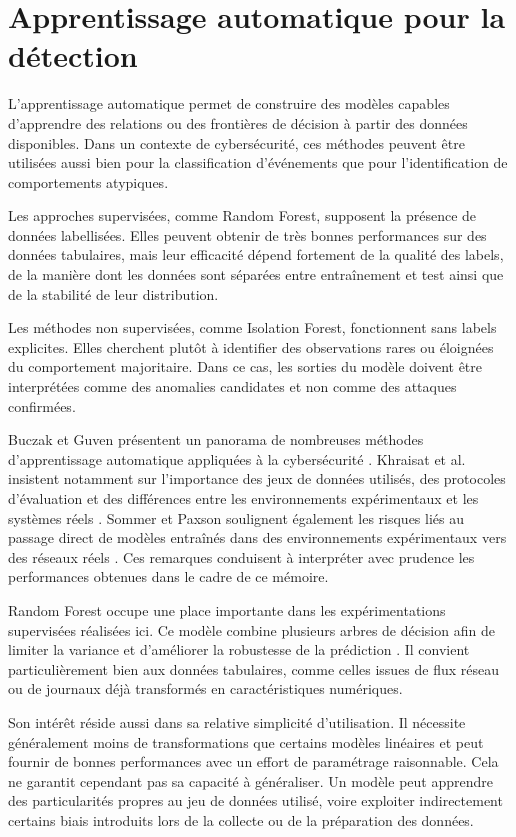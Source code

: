 \section{Apprentissage automatique pour la détection}

L'apprentissage automatique permet de construire des modèles capables d'apprendre des relations ou des frontières de décision à partir des données disponibles. Dans un contexte de cybersécurité, ces méthodes peuvent être utilisées aussi bien pour la classification d'événements que pour l'identification de comportements atypiques.

Les approches supervisées, comme Random Forest, supposent la présence de données labellisées. Elles peuvent obtenir de très bonnes performances sur des données tabulaires, mais leur efficacité dépend fortement de la qualité des labels, de la manière dont les données sont séparées entre entraînement et test ainsi que de la stabilité de leur distribution.

Les méthodes non supervisées, comme Isolation Forest, fonctionnent sans labels explicites. Elles cherchent plutôt à identifier des observations rares ou éloignées du comportement majoritaire. Dans ce cas, les sorties du modèle doivent être interprétées comme des anomalies candidates et non comme des attaques confirmées.

Buczak et Guven présentent un panorama de nombreuses méthodes d'apprentissage automatique appliquées à la cybersécurité \cite{buczak2016survey}. Khraisat et al. insistent notamment sur l'importance des jeux de données utilisés, des protocoles d'évaluation et des différences entre les environnements expérimentaux et les systèmes réels \cite{khraisat2019survey}. Sommer et Paxson soulignent également les risques liés au passage direct de modèles entraînés dans des environnements expérimentaux vers des réseaux réels \cite{sommer2010outside}. Ces remarques conduisent à interpréter avec prudence les performances obtenues dans le cadre de ce mémoire.

Random Forest occupe une place importante dans les expérimentations supervisées réalisées ici. Ce modèle combine plusieurs arbres de décision afin de limiter la variance et d'améliorer la robustesse de la prédiction \cite{breiman2001random}. Il convient particulièrement bien aux données tabulaires, comme celles issues de flux réseau ou de journaux déjà transformés en caractéristiques numériques.

Son intérêt réside aussi dans sa relative simplicité d'utilisation. Il nécessite généralement moins de transformations que certains modèles linéaires et peut fournir de bonnes performances avec un effort de paramétrage raisonnable. Cela ne garantit cependant pas sa capacité à généraliser. Un modèle peut apprendre des particularités propres au jeu de données utilisé, voire exploiter indirectement certains biais introduits lors de la collecte ou de la préparation des données.

